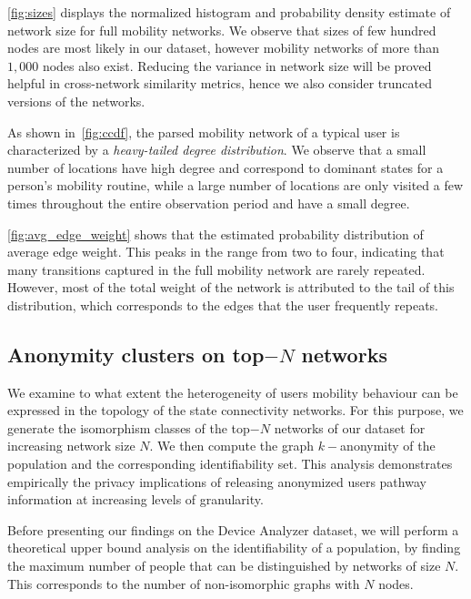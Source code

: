 \cref{fig:sizes} displays the normalized histogram and probability density estimate of network size for full mobility networks.
We observe that sizes of few hundred nodes are most likely in our dataset, however mobility networks of more than $1,000$ nodes also exist.
Reducing the variance in network size will be proved helpful in cross-network similarity metrics, hence we also consider truncated versions of the networks.

As shown in~\cref{fig:ccdf}, the parsed mobility network of a typical user is characterized by a \emph{heavy-tailed degree distribution}. We observe that a small number of locations have high degree and correspond to dominant states for a person's mobility routine, while a large number of locations are only visited a few times throughout the entire observation period and have a small degree.

 \cref{fig:avg_edge_weight} shows that the estimated probability distribution of average edge weight.
 This peaks in the range from two to four, indicating that many transitions captured in the full mobility network are rarely repeated. However, most of the total weight of the network is attributed to the tail of this distribution, which corresponds to the edges that the user frequently repeats.

\subsection{Anonymity clusters on top$-N$  networks}\label{sec:anonymity-clusters}


We examine to what extent the heterogeneity of users mobility behaviour can be expressed in the topology of the state connectivity networks.
For this purpose, we generate the isomorphism classes of the top$-N$ networks of our dataset for increasing network size $ N $.
We then compute the graph $k-$anonymity of the population and the corresponding identifiability set.
This analysis demonstrates empirically the privacy implications of releasing anonymized users pathway information at increasing levels of granularity.

Before presenting our findings on the Device Analyzer dataset, we will perform a theoretical upper bound analysis on the identifiability of a population, by finding the maximum number of people that can be distinguished by networks of size $ N $.
This corresponds to the number of non-isomorphic graphs with $ N $ nodes.

